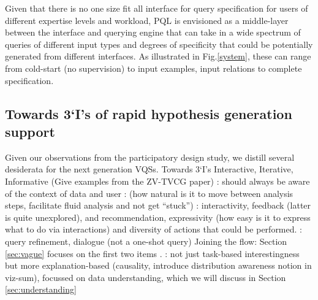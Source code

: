 \par Given that there is no one size fit all interface for query specification for users of different expertise levels and workload, PQL is envisioned as a middle-layer between the interface and querying engine that can take in a wide spectrum of queries of different input types and degrees of specificity that could be potentially generated from different interfaces. As illustrated in Fig.\ref{system}, these can range from cold-start (no supervision) to input examples, input relations to complete specification.


 \subsection{Towards 3‘I’s of rapid hypothesis generation support}
Given our observations from the participatory design study, we distill several desiderata for the next generation VQSs. 
Towards 3‘I’s Interactive, Iterative, Informative (Give examples from the ZV-TVCG paper)
: should always be aware of the context of data and user 
:
 (how natural is it to move between analysis steps, facilitate fluid analysis and not get ``stuck'') : interactivity, feedback (latter is quite unexplored), and recommendation, expressivity (how easy is it to express what to do via interactions) and diversity of actions that could be performed.
: query refinement, dialogue (not a one-shot query)
Joining the flow: Section \ref{sec:vague} focuses on the first two items .
: not just task-based interestingness but more explanation-based (causality, introduce distribution awareness notion in viz-sum), focussed on data understanding, which we will discuss in Section \ref{sec:understanding}
